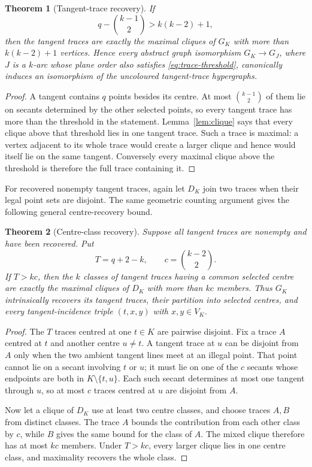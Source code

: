 \documentclass[11pt]{article}
\newtheorem{theorem}{Theorem}[section]
\theoremstyle{definition}
\theoremstyle{remark}
\begin{document}
\begin{theorem}[Tangent-trace recovery]\label{thm:traces}
If
\begin{equation}
  q-\binom{k-1}{2}>k(k-2)+1,
  \label{eq:trace-threshold}
\end{equation}
then the tangent traces are exactly the maximal cliques of $G_K$ with more
than $k(k-2)+1$ vertices.  Hence every abstract graph isomorphism
$G_K\to G_J$, where $J$ is a $k$-arc whose plane order also satisfies
\eqref{eq:trace-threshold}, canonically induces an isomorphism of the
uncoloured tangent-trace hypergraphs.
\end{theorem}

\begin{proof}
A tangent contains $q$ points besides its centre.  At most
$\binom{k-1}{2}$ of them lie on secants determined by the other selected
points, so every tangent trace has more than the threshold in the statement.
Lemma~\ref{lem:clique} says that every clique above that threshold lies in
one tangent trace.  Such a trace is maximal: a vertex adjacent to its whole
trace would create a larger clique and hence would itself lie on the same
tangent.  Conversely every maximal clique above the threshold is therefore
the full trace containing it.
\end{proof}

For recovered nonempty tangent traces, again let $D_K$ join two traces
when their legal point sets are disjoint. The same geometric counting
argument gives the following general centre-recovery bound.

\begin{theorem}[Centre-class recovery]\label{thm:centres}
Suppose all tangent traces are nonempty and have been recovered. Put
\[
  T=q+2-k,\qquad c=\binom{k-2}{2}.
\]
If $T>kc$, then the $k$ classes of tangent traces having a common selected
centre are exactly the maximal cliques of $D_K$ with more than $kc$
members.  Thus $G_K$ intrinsically recovers its tangent traces, their
partition into selected centres, and every tangent-incidence triple
$(t,x,y)$ with $x,y\in V_K$.
\end{theorem}

\begin{proof}
The $T$ traces centred at one $t\in K$ are pairwise disjoint.  Fix a trace
$A$ centred at $t$ and another centre $u\ne t$.  A tangent trace at $u$ can
be disjoint from $A$ only when the two ambient tangent lines meet at an
illegal point.  That point cannot lie on a secant involving $t$ or $u$;
it must lie on one of the $c$ secants whose endpoints are both in
$K\setminus\{t,u\}$.  Each such secant determines at most one tangent
through $u$, so at most $c$ traces centred at $u$ are disjoint from $A$.

Now let a clique of $D_K$ use at least two centre classes, and choose traces
$A,B$ from distinct classes.  The trace $A$ bounds the contribution from
each other class by $c$, while $B$ gives the same bound for the class of
$A$.  The mixed clique therefore has at most $kc$ members.  Under $T>kc$,
every larger clique lies in one centre class, and maximality recovers the
whole class.
\end{proof}
\end{document}
